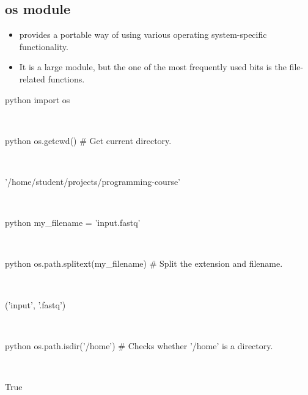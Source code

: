 \documentclass[aspectratio=1610,slidestop]{beamer}
\begin{document}
\subsection{os module}
\begin{pframe}
 \begin{itemize}
  \item provides a portable way of using various operating system-specific
  functionality.
  \item It is a large module, but the one of the most frequently used bits is
  the file-related functions.
 \end{itemize}
 \begin{ipython}
  \begin{pythonin}{python}
import os
  \end{pythonin}
  \\
  \begin{pythonin}{python}
os.getcwd()    # Get current directory.
  \end{pythonin}
  \\
  \begin{pythonout}
'/home/student/projects/programming-course'
  \end{pythonout}
  \\

  \begin{pythonin}{python}
my_filename = 'input.fastq'
  \end{pythonin}
  \\
  \begin{pythonin}{python}
os.path.splitext(my_filename)    # Split the extension and filename.
  \end{pythonin}
  \\
  \begin{pythonout}
('input', '.fastq')
  \end{pythonout}
  \\

  \begin{pythonin}{python}
os.path.isdir('/home')    # Checks whether '/home' is a directory.
  \end{pythonin}
  \\
  \begin{pythonout}
True
  \end{pythonout}
 \end{ipython}
\end{pframe}
\end{document}
